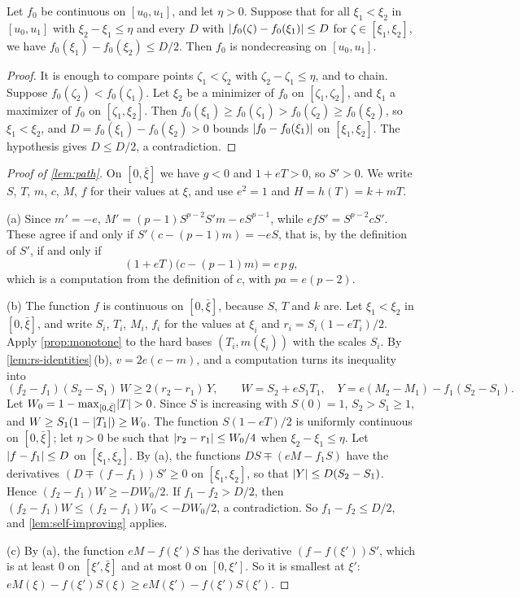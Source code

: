 \begin{lemma}\label{lem:self-improving}
Let $f_0$ be continuous on $[u_0,u_1]$, and let $\eta>0$. Suppose that for all
$\xi_1<\xi_2$ in $[u_0,u_1]$ with $\xi_2-\xi_1\le\eta$ and every $D$ with
$\lvert f_0(\zeta)-f_0(\xi_1)\rvert\le D$ for $\zeta\in[\xi_1,\xi_2]$, we have
$f_0(\xi_1)-f_0(\xi_2)\le D/2$. Then $f_0$ is nondecreasing on $[u_0,u_1]$.
\end{lemma}

\begin{proof}
It is enough to compare points $\zeta_1<\zeta_2$ with $\zeta_2-\zeta_1\le\eta$, and to chain.
Suppose $f_0(\zeta_2)<f_0(\zeta_1)$. Let $\xi_2$ be a minimizer of $f_0$ on
$[\zeta_1,\zeta_2]$, and $\xi_1$ a maximizer of $f_0$ on $[\zeta_1,\xi_2]$. Then
$f_0(\xi_1)\ge f_0(\zeta_1)>f_0(\zeta_2)\ge f_0(\xi_2)$, so $\xi_1<\xi_2$, and
$D=f_0(\xi_1)-f_0(\xi_2)>0$ bounds $\lvert f_0-f_0(\xi_1)\rvert$ on $[\xi_1,\xi_2]$. The hypothesis
gives $D\le D/2$, a contradiction.
\end{proof}

\begin{proof}[Proof of \cref{lem:path}]
On $[0,\bar\xi]$ we have $g<0$ and $1+eT>0$, so $S'>0$. We write $S$, $T$, $m$, $c$, $M$, $f$
for their values at $\xi$, and use $e^2=1$ and $H=h(T)=k+mT$.

(a) Since $m'=-e$, $M'=(p-1)S^{p-2}S'm-eS^{p-1}$, while $efS'=S^{p-2}cS'$. These agree if and
only if $S'(c-(p-1)m)=-eS$, that is, by the definition of $S'$, if and only if
\begin{equation}\label{eq:path-M}
  (1+eT)\bigl(c-(p-1)m\bigr)=e\,p\,g,
\end{equation}
which is a computation from the definition of $c$, with $pa=e(p-2)$.

(b) The function $f$ is continuous on $[0,\bar\xi]$, because $S$, $T$ and $k$ are. Let
$\xi_1<\xi_2$ in $[0,\bar\xi]$, and write $S_i$, $T_i$, $M_i$, $f_i$ for the values at $\xi_i$
and $r_i=S_i(1-eT_i)/2$. Apply \cref{prop:monotone} to the hard bases $(T_i,m(\xi_i))$ with the
scales $S_i$. By \cref{lem:rs-identities}\,(b), $v=2e(c-m)$, and a computation turns its
inequality into
\[
  (f_2-f_1)(S_2-S_1)\,W\ge2(r_2-r_1)\,Y,\qquad W=S_2+eS_1T_1,\quad
  Y=e(M_2-M_1)-f_1(S_2-S_1).
\]
Let $W_0=1-\max_{[0,\bar\xi]}\lvert T\rvert>0$. Since $S$ is increasing with $S(0)=1$, $S_2>S_1\ge1$,
and $W\ge S_1(1-\lvert T_1\rvert)\ge W_0$. The function $S(1-eT)/2$ is uniformly continuous on
$[0,\bar\xi]$; let $\eta>0$ be such that $\lvert r_2-r_1\rvert\le W_0/4$ when $\xi_2-\xi_1\le\eta$.
Let $\lvert f-f_1\rvert\le D$ on $[\xi_1,\xi_2]$. By (a), the functions $DS\mp(eM-f_1S)$ have the
derivatives $(D\mp(f-f_1))S'\ge0$ on $[\xi_1,\xi_2]$, so that $\lvert Y\rvert\le D(S_2-S_1)$. Hence
$(f_2-f_1)W\ge-DW_0/2$. If $f_1-f_2>D/2$, then $(f_2-f_1)W\le(f_2-f_1)W_0<-DW_0/2$, a
contradiction. So $f_1-f_2\le D/2$, and \cref{lem:self-improving} applies.

(c) By (a), the function $eM-f(\xi')S$ has the derivative $(f-f(\xi'))S'$, which is at least $0$
on $[\xi',\bar\xi]$ and at most $0$ on $[0,\xi']$. So it is smallest at $\xi'$:
$eM(\xi)-f(\xi')S(\xi)\ge eM(\xi')-f(\xi')S(\xi')$.
\end{proof}

